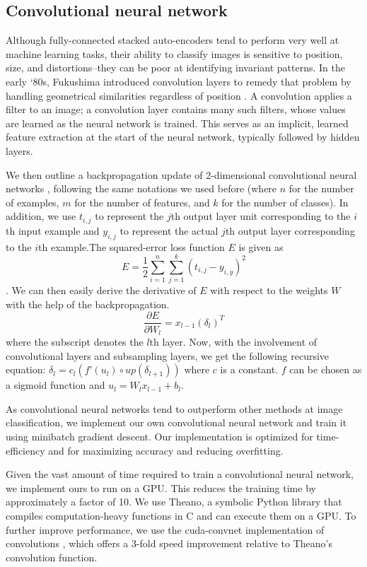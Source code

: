 \documentclass{acm_proc_article-sp}
\begin{document}
\subsection{Convolutional neural network}

Although fully-connected stacked auto-encoders tend to perform very well at machine learning tasks, their ability to classify images is sensitive to position, size, and distortions--they can be poor at identifying invariant patterns. In the early `80s, Fukushima introduced convolution layers to remedy that problem by handling geometrical similarities regardless of position \cite{Fukushima}. A convolution applies a filter to an image; a convolution layer contains many such filters, whose values are learned as the neural network is trained. This serves as an implicit, learned feature extraction at the start of the neural network, typically followed by hidden layers. 

We then outline a backpropagation update of 2-dimensional convolutional neural networks \cite{bouvrie2006notes}, following the same notations we used before (where $n$ for the number of examples, $m$ for the number of features, and $k$ for the number of classes). In addition, we use $t_{i,j}$ to represent the $j$th output layer unit corresponding to the $i$th input example and $y_{i,j}$ to represent the actual $j$th output layer corresponding to the $i$th example.The squared-error loss function $E$ is given as $$E  = \frac{1}{2} \sum_{i=1}^{n} \sum_{j=1}^{k} (t_{i,j} - y_{i,y})^2 $$. We can then easily derive the derivative of $E$ with respect to the weights $W$ with the help of the backpropagation. $$\frac{\partial E}{\partial W_l} = x_{l-1}(\delta_l)^T $$ where the subscript denotes the $l$th layer. Now, with the involvement of convolutional layers and subsampling layers, we get the following recursive equation: $\delta_l = c_l (f’ (u_l) \circ up (\delta_{l+1}))$ where $c$ is a constant. $f$ can be  chosen as a sigmoid function and $u_l = W_l x_{l-1} + b_l $.

As convolutional neural networks tend to outperform other methods at image classification, we implement our own convolutional neural network and train it using minibatch gradient descent. Our implementation is optimized for time-efficiency and for maximizing accuracy and reducing overfitting.

Given the vast amount of time required to train a convolutional neural network, we implement ours to run on a GPU. This reduces the training time by approximately a factor of 10. We use Theano\cite{Theano}, a symbolic Python library that compiles computation-heavy functions in C and can execute them on a GPU. To further improve performance, we use the cuda-convnet implementation of convolutions \cite{Krizhevsky}, which offers a 3-fold speed improvement relative to Theano's convolution function.
\end{document}
